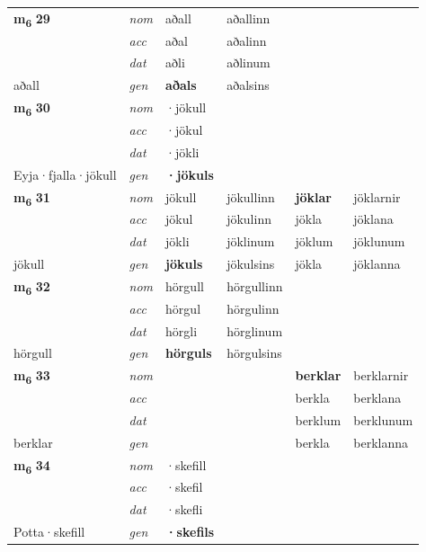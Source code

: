 \begin{longtable}[l]{X>{\footnotesize\itshape}XXXXX}
\multirow{3}{*}{{{\textbf{m{\textsubscript{6}}} \Large{\textbf{29}}}}} & nom & aðall & aðallinn & \textbf{} &  \\*
 & acc & aðal & aðalinn &  &  \\*
 & dat & aðli & aðlinum &  &  \\*
 {\footnotesize{aðall}} & gen & \textbf{aðals} & aðalsins &  &  \\
\midrule

\multirow{3}{*}{{{\textbf{m{\textsubscript{6}}} \Large{\textbf{30}}}}} & nom & ·jökull &  & \textbf{} &  \\*
 & acc & ·jökul &  &  &  \\*
 & dat & ·jökli &  &  &  \\*
 {\footnotesize{Eyja\allowbreak ·fjalla\allowbreak ·jökull}} & gen & \textbf{·jökuls} &  &  &  \\
\midrule

\multirow{3}{*}{{{\textbf{m{\textsubscript{6}}} \Large{\textbf{31}}}}} & nom & jökull & jökullinn & \textbf{jöklar} & jöklarnir \\*
 & acc & jökul & jökulinn & jökla & jöklana \\*
 & dat & jökli & jöklinum & jöklum & jöklunum \\*
 {\footnotesize{jökull}} & gen & \textbf{jökuls} & jökulsins & jökla & jöklanna \\
\midrule

\multirow{3}{*}{{{\textbf{m{\textsubscript{6}}} \Large{\textbf{32}}}}} & nom & hörgull & hörgullinn & \textbf{} &  \\*
 & acc & hörgul & hörgulinn &  &  \\*
 & dat & hörgli & hörglinum &  &  \\*
 {\footnotesize{hörgull}} & gen & \textbf{hörguls} & hörgulsins &  &  \\
\midrule

\multirow{3}{*}{{{\textbf{m{\textsubscript{6}}} \Large{\textbf{33}}}}} & nom &  &  & \textbf{berklar} & berklarnir \\*
 & acc &  &  & berkla & berklana \\*
 & dat &  &  & berklum & berklunum \\*
 {\footnotesize{berklar}} & gen & \textbf{} &  & berkla & berklanna \\
\midrule

\multirow{3}{*}{{{\textbf{m{\textsubscript{6}}} \Large{\textbf{34}}}}} & nom & ·skefill &  & \textbf{} &  \\*
 & acc & ·skefil &  &  &  \\*
 & dat & ·skefli &  &  &  \\*
 {\footnotesize{Potta\allowbreak ·skefill}} & gen & \textbf{·skefils} &  &  &  \\
\midrule


\end{longtable}
